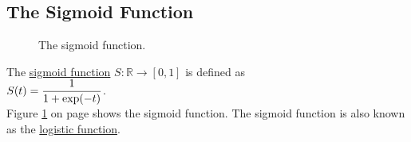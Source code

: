 \subsection{The Sigmoid Function}

\begin{figure}[!ht]
\centering
{}
\vspace*{-0.3cm}
\caption{The sigmoid function.}
\label{fig:sigmoid.eps}
\end{figure}
\FloatBarrier

\begin{Definition}
  The \href{https://en.wikipedia.org/wiki/Sigmoid_function}{sigmoid function} $S: \mathbb{R} \rightarrow [0, 1]$
   is defined as 
\\[0.2cm]
\hspace*{1.3cm}
$\displaystyle S(t) = \frac{1}{1 + \exp(-t)}$.  
\\[0.2cm]
Figure \ref{fig:sigmoid.eps} on page \pageref{fig:sigmoid.eps} shows the sigmoid function.
The sigmoid function is also known as the \href{https://en.wikipedia.org/wiki/Logistic_function}{logistic
  function}.  
\eox
\end{Definition}


